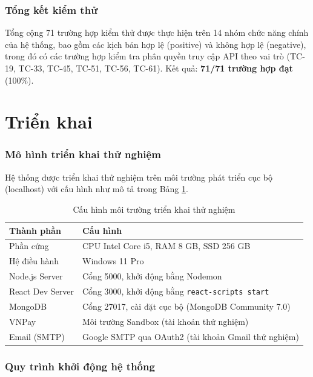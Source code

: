 \documentclass[../DoAn.tex]{subfiles}
\begin{document}
\subsubsection*{Tổng kết kiểm thử}

Tổng cộng 71 trường hợp kiểm thử được thực hiện trên 14 nhóm chức năng chính
của hệ thống, bao gồm các kịch bản hợp lệ (positive) và không hợp lệ
(negative), trong đó có các trường hợp kiểm tra phân quyền truy cập API theo
vai trò (TC-19, TC-33, TC-45, TC-51, TC-56, TC-61). Kết quả: \textbf{71/71
trường hợp đạt} (100\%).

\section{Triển khai}
\label{section:4.5}

\subsubsection*{Mô hình triển khai thử nghiệm}

Hệ thống được triển khai thử nghiệm trên môi trường phát triển cục bộ
(localhost) với cấu hình như mô tả trong Bảng \ref{tab:deploy}.

\begin{table}[H]
\centering
\caption{Cấu hình môi trường triển khai thử nghiệm}
\label{tab:deploy}
\scriptsize
\begin{tabular}{|p{4cm}|p{9cm}|}
\hline
\textbf{Thành phần} & \textbf{Cấu hình} \\
\hline
Phần cứng & CPU Intel Core i5, RAM 8 GB, SSD 256 GB \\
\hline
Hệ điều hành & Windows 11 Pro \\
\hline
Node.js Server & Cổng 5000, khởi động bằng Nodemon \\
\hline
React Dev Server & Cổng 3000, khởi động bằng \texttt{react-scripts start} \\
\hline
MongoDB & Cổng 27017, cài đặt cục bộ (MongoDB Community 7.0) \\
\hline
VNPay & Môi trường Sandbox (tài khoản thử nghiệm) \\
\hline
Email (SMTP) & Google SMTP qua OAuth2 (tài khoản Gmail thử nghiệm) \\
\hline
\end{tabular}
\end{table}

\subsubsection*{Quy trình khởi động hệ thống}
\end{document}
